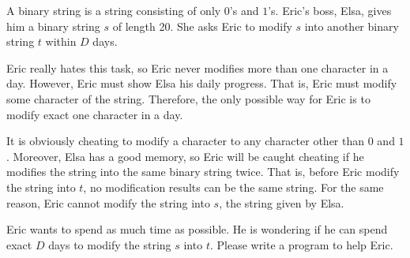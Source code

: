 A binary string is a string consisting of only $0$'s and $1$'s. 
Eric's boss, Elsa, gives him a binary string $s$ of length 20.
She asks Eric to modify $s$ into another binary string $t$ within $D$ days.

Eric really hates this task, so Eric never modifies more than one character in a day.
However, Eric must show Elsa his daily progress.
That is, Eric must modify some character of the string.
Therefore, the only possible way for Eric is to modify exact one character in a day.

It is obviously cheating to modify a character to any character other than $0$ and $1$.
Moreover, Elsa has a good memory, so Eric will be caught cheating if 
he modifies the string into the same binary string twice.
That is, before Eric modify the string into $t$, no modification results can be the same
string.
For the same reason, Eric cannot modify the string into $s$, the string given by Elsa.

Eric wants to spend as much time as possible. 
He is wondering if he can spend exact $D$ days to modify the string $s$ into $t$.
Please write a program to help Eric.
